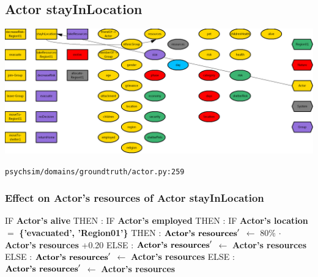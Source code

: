 \documentclass{article}%
\begin{document}
%
\subsection{Actor stayInLocation}%
\label{subsec:Actor stayInLocation}%
\includegraphics[width=\textwidth]{images/Actor-stayInLocation.png}%
\begin{flushleft}%
\verb|psychsim/domains/groundtruth/actor.py:259|%
\end{flushleft}%
\subsubsection{Effect on Actor's resources of Actor stayInLocation}%
\label{ssubsec:Effect on Actor's resources of Actor stayInLocation}%
\begin{flushleft}%
IF %
\textbf{Actor's alive}%
\linebreak%
\hspace*{2em}%
THEN %
: %
IF %
\textbf{Actor's employed}%
\linebreak%
\hspace*{4em}%
THEN %
: %
IF %
\textbf{Actor's location}%
$=$%
\textbf{\{'evacuated', 'Region01'\}}%
\linebreak%
\hspace*{6em}%
THEN %
: %
$\mbox{\textbf{Actor's resources}} '$%
$\leftarrow$%
80\%%
$\cdot$%
\textbf{Actor's resources}%
+0.20%
\linebreak%
\hspace*{6em}%
ELSE %
: %
$\mbox{\textbf{Actor's resources}} '$%
$\leftarrow$%
\textbf{Actor's resources}%
\linebreak%
\hspace*{4em}%
ELSE %
: %
$\mbox{\textbf{Actor's resources}} '$%
$\leftarrow$%
\textbf{Actor's resources}%
\linebreak%
\hspace*{2em}%
ELSE %
: %
$\mbox{\textbf{Actor's resources}} '$%
$\leftarrow$%
\textbf{Actor's resources}%
\end{flushleft}
\end{document}

